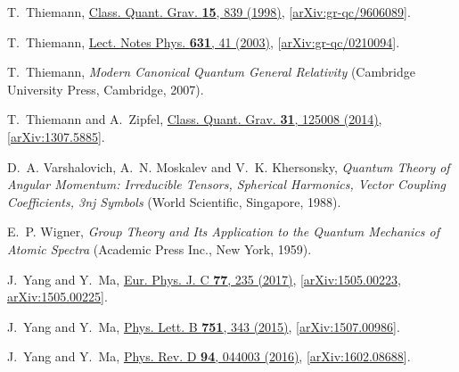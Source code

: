 \documentclass[graybox, secnum]{svmult}
\begin{document}
\begin{thebibliography}{99}
T.~Thiemann, %
  \href{http://dx.doi.org/10.1088/0264-9381/15/4/011}{Class. Quant. Grav.
  {\bfseries 15}, 839 (1998)},
  [\href{http://arxiv.org/abs/gr-qc/9606089}{arXiv:gr-qc/9606089}].

T.~Thiemann,
  \href{http://dx.doi.org/10.1007/978-3-540-45230-0_3}{Lect. Notes Phys.
  {\bfseries 631}, 41 (2003)},
  [\href{http://arxiv.org/abs/gr-qc/0210094}{arXiv:gr-qc/0210094}].

T.~Thiemann, {\em {Modern Canonical Quantum General Relativity}} (Cambridge
  University Press, Cambridge, 2007).

T.~Thiemann and A.~Zipfel, %
  \href{http://dx.doi.org/10.1088/0264-9381/31/12/125008}{Class.
  Quant. Grav. {\bfseries 31}, 125008 (2014)},
  [\href{http://arxiv.org/abs/1307.5885}{arXiv:1307.5885}].

D.~A. Varshalovich, A.~N. Moskalev and V.~K. Khersonsky, {\em {Quantum Theory
  of Angular Momentum: Irreducible Tensors, Spherical Harmonics, Vector
  Coupling Coefficients, 3nj Symbols}} (World Scientific, Singapore, 1988).

E.~P. Wigner, {\em Group Theory and Its Application to the Quantum Mechanics of
Atomic Spectra} (Academic Press Inc., New York, 1959).

J.~Yang and Y.~Ma, %
  \href{http://dx.doi.org/10.1140/epjc/s10052-017-4713-0}{Eur. Phys. J. C
  {\bfseries 77}, 235 (2017)},
  [\href{http://arxiv.org/abs/1505.00223}{arXiv:1505.00223}, \href{http://arxiv.org/abs/1505.00225}{arXiv:1505.00225}].

J.~Yang and Y.~Ma, %
  \href{http://dx.doi.org/10.1016/j.physletb.2015.10.062}{Phys. Lett.
  B {\bfseries 751}, 343 (2015)},
  [\href{http://arxiv.org/abs/1507.00986}{arXiv:1507.00986}].

J.~Yang and Y.~Ma, %
  \href{http://dx.doi.org/10.1103/PhysRevD.94.044003}{Phys. Rev. D
  {\bfseries 94}, 044003 (2016)},
  [\href{http://arxiv.org/abs/1602.08688}{arXiv:1602.08688}].


\end{thebibliography}
\end{document}
